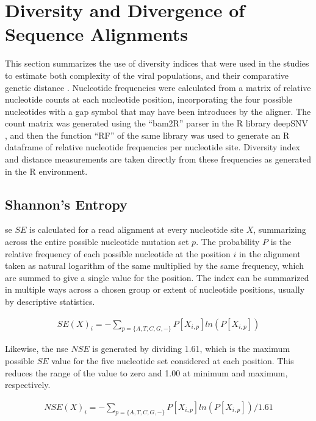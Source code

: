 \section{Diversity and Divergence of Sequence Alignments}
This section summarizes the use of diversity indices that were used in the studies to estimate both
complexity of the viral populations, and their comparative genetic distance \parencite{Nishijima:2012ew,Li:2010jl}. Nucleotide frequencies were calculated from a matrix of relative nucleotide counts at each nucleotide position, incorporating the four possible nucleotides with a gap symbol that may have been introduces by the aligner. The count matrix was generated using the ``bam2R'' parser in the R library deepSNV \parencite{Gerstung:2012js}, and then the function ``RF'' of the same library was used to generate an R dataframe of relative nucleotide frequencies per nucleotide site. Diversity index and distance measurements are taken directly from these frequencies
as generated in the R environment.

\subsection{Shannon's Entropy}
\Gls{se} $SE$ is calculated for a read alignment at every nucleotide site $X$, summarizing across the entire possible nucleotide mutation set $p$. The probability $P$ is the relative frequency of each possible nucleotide at the position $i$ in the alignment taken as natural logarithm of the same multiplied by the same frequency, which are summed to give a single value for the position. The index can be summarized in multiple ways across
a chosen group or extent of nucleotide positions, usually by descriptive statistics.
	
\begin{align*}
	SE(X)_{ i }=-\sum _{ p=\{ A,T,C,G,-\}  }^{  }{ P[X_{ i,p }]ln(P[{ X }_{ i,p }])}
\end{align*}

Likewise, the \gls{nse} $NSE$ is generated by dividing 1.61, which is the maximum possible $SE$ value for 
the five nucleotide set considered at each position. This reduces the range of the value to zero and 1.00 at minimum and maximum, respectively.	

	\begin{align*}
	NSE(X)_{ i }=-\sum _{ p=\{ A,T,C,G,-\}  }^{  }{ P[X_{ i,p }]ln(P[{ X }_{ i,p }])}/1.61
	\end{align*}

